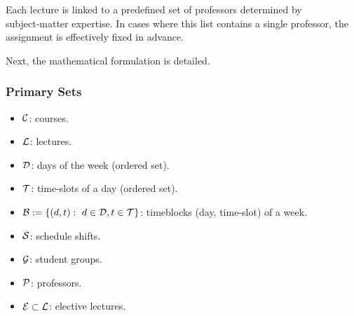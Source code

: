 
Each lecture is linked to a predefined set of professors determined by subject‑matter expertise. In cases where this list contains a single professor, the assignment is effectively fixed in advance.




Next, the mathematical formulation is detailed.


        
    \subsubsection{Primary Sets}

        \begin{itemize}
            \item $\mathcal{C}$: courses.
            \item $\mathcal{L}$: lectures.
            \item $\mathcal{D}$: days of the week (ordered set).
            \item $\mathcal{T}$: time-slots of a day (ordered set).
            \item $\mathcal{B} := \{(d,t): \ d\in\mathcal{D}, t\in\mathcal{T}\}$: timeblocks (day, time-slot) of a week.
            \item $\mathcal{S}$: schedule shifts.
            \item $\mathcal{G}$: student groups.
            \item $\mathcal{P}$: professors.
            \item $\mathcal{E} \subset \mathcal{L}$: elective lectures.
        \end{itemize}




